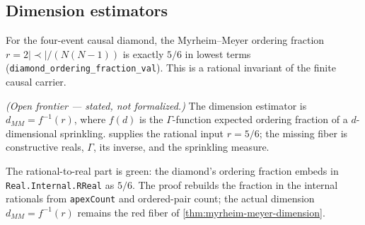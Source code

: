 \subsection{Dimension estimators}

\begin{theorem}[Diamond ordering fraction $r=5/6$]\label{thm:mm-ordering-fraction}\leanok{}
For the four-event causal diamond, the Myrheim--Meyer ordering fraction
$r=2|{\prec}|/(N(N-1))$ is exactly $5/6$ in lowest terms
(\texttt{diamond\_ordering\_fraction\_val}).  This is a rational invariant of
the finite causal carrier.
\end{theorem}

\begin{theorem}\label{thm:myrheim-meyer-dimension}\notready{}
\emph{(Open frontier --- stated, not formalized.)} The dimension estimator is
$d_{MM}=f^{-1}(r)$, where $f(d)$ is the $\Gamma$-function expected ordering
fraction of a $d$-dimensional sprinkling.  
supplies the rational input $r=5/6$; the missing fiber is constructive reals,
$\Gamma$, its inverse, and the sprinkling measure.
\end{theorem}

\begin{theorem}\label{thm:myrheim-meyer-real-bridge}\leanok{}
The rational-to-real part is green: the diamond's ordering fraction embeds in
\texttt{Real.Internal.RReal} as $5/6$.  The proof rebuilds the fraction in the
internal rationals from \texttt{apexCount} and ordered-pair count; the actual
dimension $d_{MM}=f^{-1}(r)$ remains the red fiber of
\cref{thm:myrheim-meyer-dimension}.
\end{theorem}

